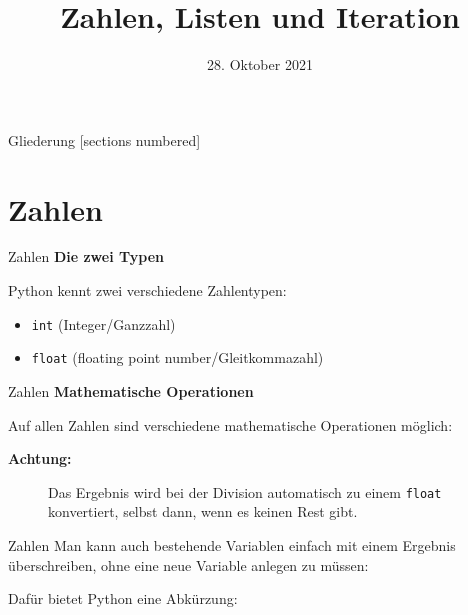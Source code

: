 



\title{Zahlen, Listen und Iteration}
\date{28. Oktober 2021}



	
\maketitle

\begin{frame}{Gliederung}
	[sections numbered]
	\tableofcontents
\end{frame}

\section{Zahlen}
\begin{frame}{Zahlen}
	\textbf{Die zwei Typen}
	\linebreak
	
	Python kennt zwei verschiedene Zahlentypen: 
	\begin{itemize}
		\item \alert{\texttt{int}} (Integer/Ganzzahl)
		
		\item \alert{\texttt{float}} (floating point number/Gleitkommazahl)
		
	\end{itemize}		
\end{frame}

\begin{frame}{Zahlen}
	\textbf{Mathematische Operationen}
	\linebreak

	Auf allen Zahlen sind verschiedene mathematische Operationen möglich:
	
	\begin{description}
		\item[\textbf{Achtung:}] Das Ergebnis wird bei der Division automatisch zu einem \alert{\texttt{float}} konvertiert, selbst dann, wenn es keinen Rest gibt.
	\end{description}
\end{frame}

\begin{frame}{Zahlen}
	Man kann auch bestehende Variablen einfach mit einem Ergebnis überschreiben, ohne eine neue Variable anlegen zu müssen:
	
	Dafür bietet Python eine Abkürzung:
	
\end{frame}

